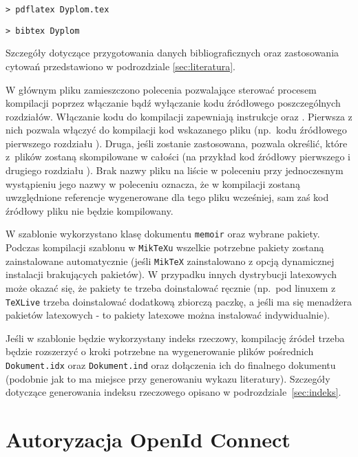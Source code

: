 \begin{lstlisting}[basicstyle=\ttfamily]
> pdflatex Dyplom.tex
\end{lstlisting}

\begin{lstlisting}[basicstyle=\ttfamily]
> bibtex Dyplom
\end{lstlisting}
Szczegóły dotyczące przygotowania danych bibliograficznych oraz zastosowania cytowań przedstawiono w podrozdziale \ref{sec:literatura}.

W głównym pliku zamieszczono polecenia pozwalające sterować procesem kompilacji poprzez włączanie bądź wyłączanie kodu źródłowego poszczególnych rozdziałów. Włączanie kodu do kompilacji zapewniają instrukcje \verb++ oraz \verb++. Pierwsza z nich pozwala włączyć do kompilacji kod wskazanego pliku (np.\ kodu źródłowego pierwszego rozdziału \verb++). Druga, jeśli zostanie zastosowana, pozwala określić, które z~plików zostaną skompilowane w całości (na przykład kod źródłowy pierwszego i drugiego rozdziału \verb++).
Brak nazwy pliku na liście w poleceniu \verb++ przy jednoczesnym wystąpieniu jego nazwy w poleceniu \verb++ oznacza, że w kompilacji zostaną uwzględnione referencje wygenerowane dla tego pliku wcześniej, sam zaś kod źródłowy pliku nie będzie kompilowany. 

W szablonie wykorzystano klasę dokumentu \texttt{memoir} oraz wybrane pakiety. Podczas kompilacji szablonu w \texttt{MikTeXu} wszelkie potrzebne pakiety zostaną zainstalowane automatycznie (jeśli \texttt{MikTeX} zainstalowano z opcją dynamicznej instalacji brakujących pakietów). W przypadku innych dystrybucji latexowych może okazać się, że pakiety te trzeba doinstalować ręcznie (np.\ pod linuxem z \texttt{TeXLive} trzeba doinstalować dodatkową zbiorczą paczkę, a jeśli ma się menadżera pakietów latexowych - to pakiety latexowe można instalować indywidualnie).

Jeśli w szablonie będzie wykorzystany indeks rzeczowy, kompilację źródeł trzeba będzie rozszerzyć o kroki potrzebne na wygenerowanie plików pośrednich \texttt{Dokument.idx} oraz \texttt{Dokument.ind} oraz dołączenia ich do finalnego dokumentu (podobnie jak to ma miejsce przy generowaniu wykazu literatury).
Szczegóły dotyczące generowania indeksu rzeczowego opisano w podrozdziale~\ref{sec:indeks}.

\section{Autoryzacja OpenId Connect}
\label{sec:autoryzacja}